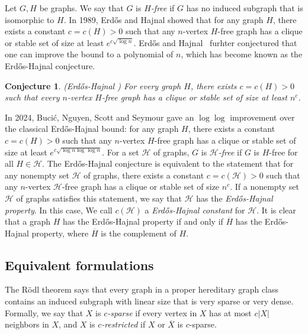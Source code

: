 \documentclass[a4paper,11pt]{article}
\newtheorem{conjecture}{Conjecture}
\begin{document}
Let $G,H$ be graphs. We say that $G$ is {\em $H$-free} if $G$ has no induced subgraph that is isomorphic to $H$. 
In 1989, Erd\H{o}s and Hajnal \cite{EH89} showed that 
for any graph $H$, there exists a constant $c=c(H)>0$ such that 
any $n$-vertex $H$-free graph has a clique or stable set of size at least $e^{c\sqrt{\log n}}$.
Erd\H{o}s and Hajnal~\cite{EH89} furhter conjectured that one can improve the bound to a polynomial of $n$, which has become known as the Erd\H{o}s-Hajnal conjecture.

\begin{conjecture}\label{conj:E-H}
\textnormal{(Erd\H{o}s-Hajnal \cite{EH89})} For every graph $H$, there exists $c=c(H)>0$ such that every $n$-vertex $H$-free graph has a clique or stable set of size at least $n^c$.
\end{conjecture}

In 2024, Buci\'c, Nguyen, Scott and Seymour \cite{BNSS24} gave an $\log \log$ improvement over the classical Erd\H{o}s-Hajnal bound: for any graph $H$, there exists a constant $c=c(H)>0$ such that
any $n$-vertex $H$-free graph has a clique or stable set of size at least $e^{c\sqrt{\log n \log \log n}}$.
For a set $\mathcal{H}$ of graphs, $G$ is {\em $\mathcal{H}$-free} if $G$ is $H$-free for all $H\in\mathcal{H}$.
The Erd\H{o}s-Hajnal conjecture is equivalent to the statement that for any nonempty set $\mathcal{H}$ of graphs, there exists a constant $c=c(\mathcal{H})>0$ such that any $n$-vertex $\mathcal{H}$-free graph has a clique or stable set of size $n^c$.
If a nonempty set $\mathcal{H}$ of graphs satisfies this statement, we say that $\mathcal{H}$ has the {\em Erd\H{o}s-Hajnal property}. In this case, We call $c(\mathcal{H})$ a {\em Erd\H{o}s-Hajnal constant} for $\mathcal{H}$.
It is clear that a graph $H$ has the Erd\H{o}s-Hajnal property if and only if $\overline{H}$ has the Erd\H{o}s-Hajnal property, where $\overline{H}$ is the complement of $H$. 

\subsection{Equivalent formulations}

The R\"odl theorem says that every graph in a proper hereditary graph class contains an induced subgraph with linear size that is very sparse or very dense. Formally, we say that $X$ is {\em $c$-sparse} if every vertex in $X$ has at most $c|X|$ neighbors in $X$, and $X$ is {\em $c$-restricted} if $X$ or $\overline{X}$ is $c$-sparse. 
\end{document}
